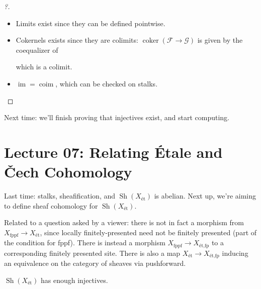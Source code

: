 \begin{proof}[?]

\envlist

\begin{itemize}
\item
  Limits exist since they can be defined pointwise.
\item
  Cokernels exists since they are colimits:
  \(\operatorname{coker}(\mathcal{F} \to \mathcal{G})\) is given by the
  coequalizer of

  which is a colimit.
\item
  \(\operatorname{im}= \operatorname{coim}\), which can be checked on
  stalks.
\end{itemize}

\end{proof}

Next time: we'll finish proving that injectives exist, and start
computing.

\hypertarget{lecture-07-relating-uxe9tale-and-ux10dech-cohomology}{%
\section{Lecture 07: Relating Étale and Čech
Cohomology}\label{lecture-07-relating-uxe9tale-and-ux10dech-cohomology}}

Last time: stalks, sheafification, and
\({\operatorname{Sh}}(X_{\text{ét}})\) is abelian. Next up, we're aiming
to define sheaf cohomology for \({\operatorname{Sh}}(X_\text{ét})\).

\begin{remark}[Esoteric!]

Related to a question asked by a viewer: there is not in fact a morphism
from \(X_{\mathrm{\operatorname{fppf}}} \to X_{\text{ét}}\), since
locally finitely-presented need not be finitely presented (part of the
condition for fppf). There is instead a morphism
\(X_{\mathrm{\operatorname{fppf}}}\to X_{\text{ét}, \text{fp}}\) to a
corresponding finitely presented site. There is also a map
\(X_{\text{ét}} \to X_{\text{ét}, \text{fp}}\) inducing an equivalence
on the category of sheaves via pushforward.

\end{remark}

\begin{theorem}

\({\operatorname{Sh}}(X_\text{ét})\) has enough injectives.

\end{theorem}

